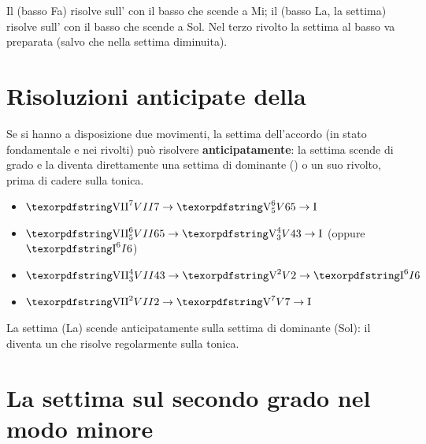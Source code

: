 \begin{esempio}
	\label{ex:vii7_rivolti}
	Il  (basso Fa) risolve sull' con il basso che scende a Mi; il  (basso La, la settima) risolve sull' con il basso che scende a Sol. Nel terzo rivolto la settima al basso va preparata (salvo che nella settima diminuita).
\end{esempio}

\section{Risoluzioni anticipate della }
\label{subsec:risoluzioni_anticipate}

Se si hanno a disposizione due movimenti, la settima dell'accordo (in stato fondamentale e nei rivolti) può risolvere \textbf{anticipatamente}: la settima scende di grado e la  diventa direttamente una settima di dominante () o un suo rivolto, prima di cadere sulla tonica.

\begin{regola}
	\label{reg:risoluzioni_anticipate}
	\begin{itemize}
		\item $\sigla{VII}{7}{} \rightarrow \sigla{V}{6}{5} \rightarrow \text{I}$
		\item $\sigla{VII}{6}{5} \rightarrow \sigla{V}{4}{3} \rightarrow \text{I}$ (oppure $\sigla{I}{6}{}$)
		\item $\sigla{VII}{4}{3} \rightarrow \sigla{V}{2}{} \rightarrow \sigla{I}{6}{}$
		\item $\sigla{VII}{2}{} \rightarrow \sigla{V}{7}{} \rightarrow \text{I}$
	\end{itemize}
\end{regola}

\begin{esempio}
	\label{ex:risoluzione_anticipata}
	La settima (La) scende anticipatamente sulla settima di dominante (Sol): il  diventa un  che risolve regolarmente sulla tonica.
\end{esempio}

\section{La settima sul secondo grado nel modo minore}
\label{sec:ii7_minore}

